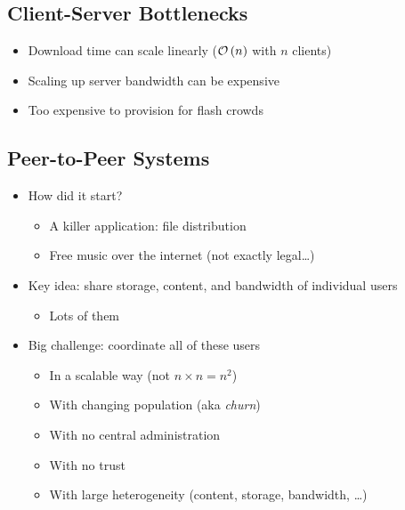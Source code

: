 \subsection{Client-Server Bottlenecks}
\begin{itemize}[nosep]
    \item Download time can scale linearly ($\mathcal{O}\left(n\right)$ with $n$ clients)
    \item Scaling up server bandwidth can be expensive
    \item Too expensive to provision for flash crowds
\end{itemize}
\subsection{Peer-to-Peer Systems}
\begin{itemize}
    \item How did it start?
          \begin{itemize}[nosep]
              \item A killer application: file distribution
              \item Free music over the internet (not exactly legal\dots)
          \end{itemize}
    \item Key idea: share storage, content, and bandwidth of individual users
          \begin{itemize}[nosep]
              \item Lots of them
          \end{itemize}
    \item Big challenge: coordinate all of these users
          \begin{itemize}[nosep]
              \item In a scalable way (not $n\times n=n^2$)
              \item With changing population (aka \emph{churn})
              \item With no central administration
              \item With no trust
              \item With large heterogeneity (content, storage, bandwidth, \dots)
          \end{itemize}
\end{itemize}
